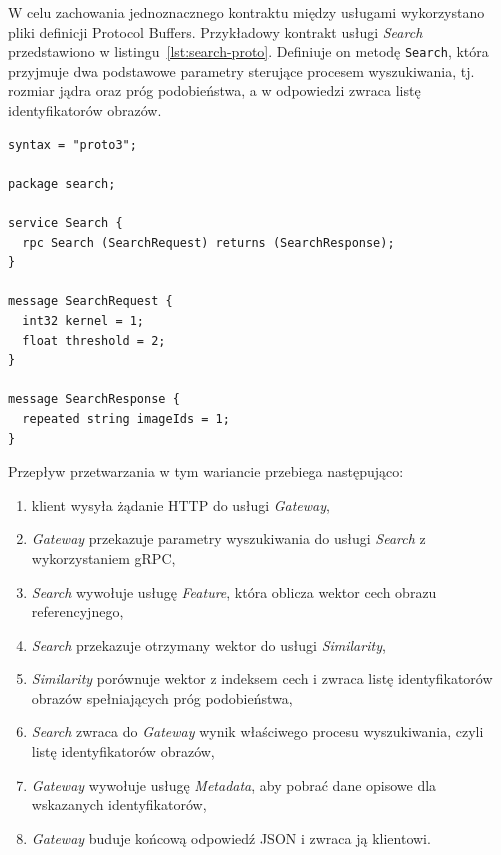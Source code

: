 W celu zachowania jednoznacznego kontraktu między usługami wykorzystano pliki definicji Protocol Buffers. Przykładowy kontrakt usługi \textit{Search} przedstawiono w listingu~\ref{lst:search-proto}. Definiuje on metodę \texttt{Search}, która przyjmuje dwa podstawowe parametry sterujące procesem wyszukiwania, tj. rozmiar jądra oraz próg podobieństwa, a w odpowiedzi zwraca listę identyfikatorów obrazów.

\begin{listing}[H]
    \begin{verbatim}
syntax = "proto3";

package search;

service Search {
  rpc Search (SearchRequest) returns (SearchResponse);
}

message SearchRequest {
  int32 kernel = 1;
  float threshold = 2;
}

message SearchResponse {
  repeated string imageIds = 1;
}
    \end{verbatim}
    \caption{Przykładowy kontrakt Protocol Buffers dla usługi \textit{Search}}
    \label{lst:search-proto}
\end{listing}

Przepływ przetwarzania w tym wariancie przebiega następująco:
\begin{enumerate}
    \item klient wysyła żądanie HTTP do usługi \textit{Gateway},
    \item \textit{Gateway} przekazuje parametry wyszukiwania do usługi \textit{Search} z wykorzystaniem gRPC,
    \item \textit{Search} wywołuje usługę \textit{Feature}, która oblicza wektor cech obrazu referencyjnego,
    \item \textit{Search} przekazuje otrzymany wektor do usługi \textit{Similarity},
    \item \textit{Similarity} porównuje wektor z indeksem cech i zwraca listę identyfikatorów obrazów spełniających próg podobieństwa,
    \item \textit{Search} zwraca do \textit{Gateway} wynik właściwego procesu wyszukiwania, czyli listę identyfikatorów obrazów,
    \item \textit{Gateway} wywołuje usługę \textit{Metadata}, aby pobrać dane opisowe dla wskazanych identyfikatorów,
    \item \textit{Gateway} buduje końcową odpowiedź JSON i zwraca ją klientowi.
\end{enumerate}

